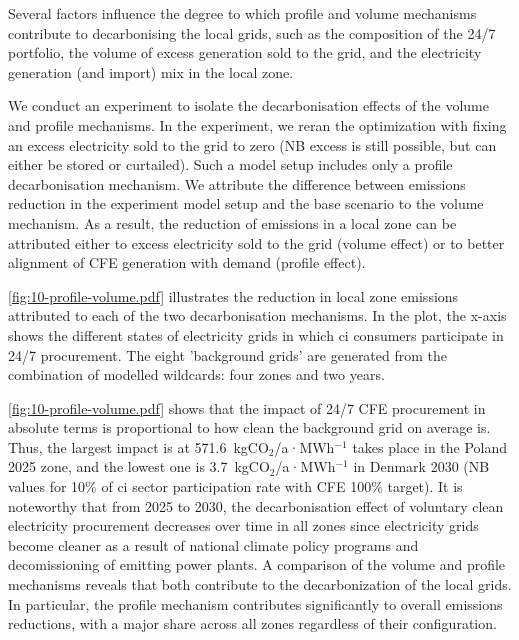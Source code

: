 Several factors influence the degree to which profile and volume mechanisms contribute to decarbonising the local grids, such as the composition of the 24/7 portfolio, the volume of excess generation sold to the grid, and the electricity generation (and import) mix in the local zone.

We conduct an experiment to isolate the decarbonisation effects of the volume and profile mechanisms.
In the experiment, we reran the optimization with fixing an excess electricity sold to the grid to zero (NB excess is still possible, but can either be stored or curtailed). 
Such a model setup includes only a profile decarbonisation mechanism. 
We attribute the difference between emissions reduction in the experiment model setup and the base scenario to the volume mechanism.
As a result, the reduction of emissions in a local zone can be attributed either to excess electricity sold to the grid (volume effect) or to better alignment of CFE generation with demand (profile effect).

\cref{fig:10-profile-volume.pdf} illustrates the reduction in local zone emissions attributed to each of the two decarbonisation mechanisms.
In the plot, the x-axis shows the different states of electricity grids in which \gls{ci} consumers participate in 24/7 procurement.
The eight 'background grids' are generated from the combination of modelled wildcards: four zones and two years.

\cref{fig:10-profile-volume.pdf} shows that the impact of 24/7 CFE procurement in absolute terms is proportional to how clean the background grid on average is.
Thus, the largest impact is at 571.6~kgCO$_2$/a·MWh$^{-1}$ takes place in the Poland 2025 zone, and the lowest one is 3.7~kgCO$_2$/a·MWh$^{-1}$ in Denmark 2030 (NB values for 10\% of \gls{ci} sector participation rate with CFE 100\% target).
It is noteworthy that from 2025 to 2030, the decarbonisation effect of voluntary clean electricity procurement decreases over time in all zones since electricity grids become cleaner as a result of national climate policy programs and decomissioning of emitting power plants.
A comparison of the volume and profile mechanisms reveals that both contribute to the decarbonization of the local grids.
In particular, the profile mechanism contributes significantly to overall emissions reductions, with a major share across all zones regardless of their configuration.

